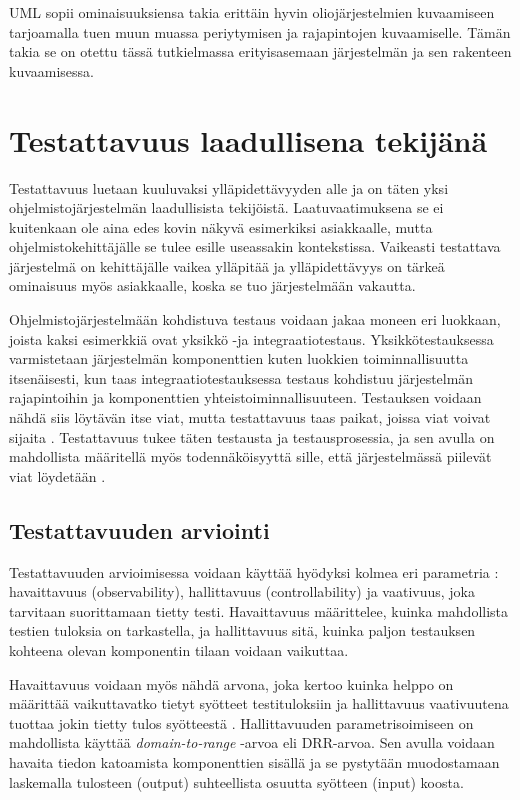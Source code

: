 \documentclass[finnish]{tktltiki2}
\numberwithin{table}{section}
\theoremstyle{definition}
\theoremstyle{remark}
\begin{document}
UML sopii ominaisuuksiensa takia erittäin hyvin oliojärjestelmien kuvaamiseen tarjoamalla tuen muun muassa periytymisen ja rajapintojen kuvaamiselle. Tämän takia se on otettu tässä tutkielmassa erityisasemaan järjestelmän ja sen rakenteen kuvaamisessa.


\section{Testattavuus laadullisena tekijänä} \label{testability_main}
Testattavuus luetaan kuuluvaksi ylläpidettävyyden alle \citep{ISO/IEC25010:2011} ja on täten yksi ohjelmistojärjestelmän laadullisista tekijöistä. Laatuvaatimuksena se ei kuitenkaan ole aina edes kovin näkyvä esimerkiksi asiakkaalle, mutta ohjelmistokehittäjälle se tulee esille useassakin kontekstissa. Vaikeasti testattava järjestelmä on kehittäjälle vaikea ylläpitää ja ylläpidettävyys on tärkeä ominaisuus myös asiakkaalle, koska se tuo järjestelmään vakautta.

Ohjelmistojärjestelmään kohdistuva testaus voidaan jakaa moneen eri luokkaan, joista kaksi esimerkkiä ovat yksikkö -ja integraatiotestaus. Yksikkötestauksessa varmistetaan järjestelmän komponenttien kuten luokkien toiminnallisuutta itsenäisesti, kun taas integraatiotestauksessa testaus kohdistuu järjestelmän rajapintoihin ja komponenttien yhteistoiminnallisuuteen. Testauksen voidaan nähdä siis löytävän itse viat, mutta testattavuus taas paikat, joissa viat voivat sijaita \citep[s. 19]{Voas:1995:STN:624607.625469}. Testattavuus tukee täten testausta ja testausprosessia, ja sen avulla on mahdollista määritellä myös todennäköisyyttä sille, että järjestelmässä piilevät viat löydetään \citep{voas_improving_1992}. 


\subsection{Testattavuuden arviointi} \label{contro_and_observ}

Testattavuuden arvioimisessa voidaan käyttää hyödyksi kolmea eri parametria \citep[s. 2]{baudry_measuring_2003}: havaittavuus (observability), hallittavuus (controllability) ja vaativuus, joka tarvitaan suorittamaan tietty testi. Havaittavuus määrittelee, kuinka mahdollista testien tuloksia on tarkastella, ja hallittavuus sitä, kuinka paljon testauksen kohteena olevan komponentin tilaan voidaan vaikuttaa. 

Havaittavuus voidaan myös nähdä arvona, joka kertoo kuinka helppo on määrittää vaikuttavatko tietyt syötteet testituloksiin ja hallittavuus vaativuutena tuottaa jokin tietty tulos syötteestä \citep[s. 554]{Freedman:1991:TSC:126218.126229}. 
Hallittavuuden parametrisoimiseen on mahdollista käyttää \textit{domain-to-range} -arvoa eli DRR-arvoa. Sen avulla voidaan havaita tiedon katoamista komponenttien sisällä \citep{Voas:1995:STN:624607.625469} ja se pystytään muodostamaan laskemalla tulosteen (output) suhteellista osuutta syötteen (input) koosta.
\end{document}
